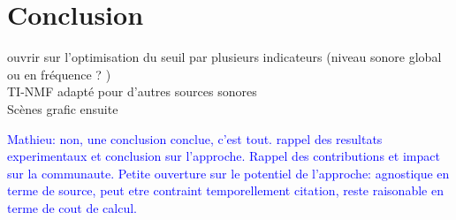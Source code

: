 \documentclass[twocolumn,a4paper,10pt]{article}
\newcommand{\ml}[1]{\textcolor{blue}{ Mathieu: #1}}
\begin{document}
\section{Conclusion}
ouvrir sur l'optimisation du seuil par plusieurs indicateurs (niveau sonore global ou en fréquence ? )\\
TI-NMF adapté pour d'autres sources sonores \\
Scènes grafic ensuite

\ml{non, une conclusion conclue, c'est tout.
rappel des resultats experimentaux et conclusion sur l'approche. Rappel des contributions et impact sur la communaute.
Petite ouverture sur le potentiel de l'approche: agnostique en terme de source, peut etre contraint temporellement citation, reste raisonable en terme de cout de calcul. }

\footnotesize


\end{document}
